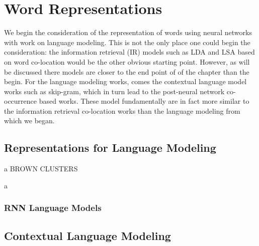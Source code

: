 \documentclass[parskip]{komatufte}
\begin{document}
\chapter{Word Representations}\label{sec:word-representations}


We begin the consideration of the representation of words using neural networks with work on language modeling.
This is not the only place one could begin the consideration: the information retrieval (IR) models such as LDA and LSA based on word co-location would be the other obvious starting point.
However, as will be discussed there models are closer to the end point of of the chapter than the begin.
For the language modeling works, comes the contextual language model works such as skip-gram, which in turn lead to the post-neural network co-occurrence based works.
These model fundamentally are in fact more similar to the information retrieval co-location works than the language modeling from which we began.


\section{Representations for Language Modeling}
 a
BROWN CLUSTERS

 a



\subsection{RNN Language Models}

\section{Contextual Language Modeling}
\end{document}
